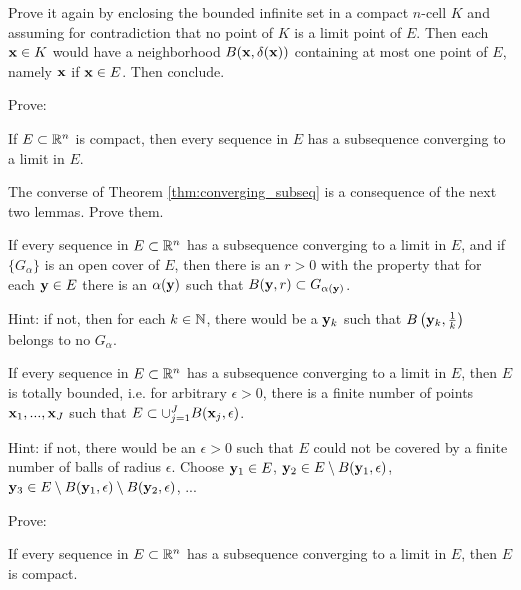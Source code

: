 \medskip

\noindent
Prove it again by enclosing the bounded infinite set in a compact $n$-cell $K$ and assuming for contradiction that no point of $K$ is a limit point of $E$.  Then each $\mathbf{x} \in K$ would have a neighborhood $B(\mathbf{x},\delta (\mathbf{x}))$ containing at most one point of $E$, namely $\mathbf{x}$ if $\mathbf{x} \in E$.  Then conclude.

\medskip

\noindent
Prove:
\begin{thm}\label{thm:converging_subseq}
If $E \subset \mathbb{R}^n$ is compact, then every sequence in $E$ has a subsequence converging to a limit in $E$.
\end{thm}

\medskip

\noindent
The converse of Theorem \ref{thm:converging_subseq} is a consequence of the next two lemmas.  Prove them.


\begin{lem}
If every sequence in $E \subset \mathbb{R}^n$ has a subsequence converging to a limit in $E$, and if $\{ G_\alpha \}$ is an open cover of $E$, then there is an $r > 0$ with the property that for each $\mathbf{y} \in E$ there is an $\alpha (\mathbf{y})$ such that $B(\mathbf{y},r) \subset G_{\alpha(\mathbf{y})}$.
\end{lem}
\noindent
Hint: if not, then for each $k \in \mathbb{N}$, there would be a $\mathbf{y}_k$ such that $B \left(\mathbf{y}_k,\frac{1}{k}\right)$ belongs to no $G_\alpha$.

\medskip

\begin{lem}
If every sequence in $E \subset \mathbb{R}^n$ has a subsequence converging to a limit in $E$, then $E$ is totally bounded, i.e. for arbitrary $\epsilon > 0$, there is a finite number of points $\mathbf{x}_1, ..., \mathbf{x}_J$ such that $E \subset \cup^J_{j=1} B(\mathbf{x}_j,\epsilon)$.
\end{lem}
\noindent
Hint: if not, there would be an $\epsilon > 0$ such that $E$ could not be covered by a finite number of balls of radius $\epsilon$.  Choose $\mathbf{y}_1 \in E$, $\mathbf{y}_2 \in E \setminus B(\mathbf{y}_1,\epsilon)$, $\mathbf{y}_3 \in E \setminus B(\mathbf{y}_1,\epsilon) \setminus B(\mathbf{y}_2,\epsilon)$, ...

\medskip

\newpage

\noindent
Prove:
\begin{thm}%
If every sequence in $E \subset \mathbb{R}^n$ has a subsequence converging to a limit in $E$, then $E$ is compact.
\end{thm}

